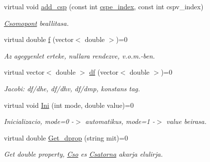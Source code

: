 \begin{DoxyCompactItemize}
virtual void \hyperlink{class_agelem_aa440ca95f0c0d27092f048f0c95cd998}{add\+\_\+csp} (const int \hyperlink{class_agelem_a9639c0a7a0165b644d62033e24eb6d24}{cspe\+\_\+index}, const int cspv\+\_\+index)
\begin{DoxyCompactList}\small\item\em \hyperlink{class_csomopont}{Csomopont} beallitasa. \end{DoxyCompactList}\item 
\mbox{\label{class_agelem_aa1d93be52ddae11df003c4e35c47084b}} 
virtual double \hyperlink{class_agelem_aa1d93be52ddae11df003c4e35c47084b}{f} (vector$<$ double $>$)=0
\begin{DoxyCompactList}\small\item\em Az agegyenlet erteke, nullara rendezve, v.\+o.\+m.-\/ben. \end{DoxyCompactList}\item 
\mbox{\label{class_agelem_a7934ea6320bdc37526ed3daa108ce1ed}} 
virtual vector$<$ double $>$ \hyperlink{class_agelem_a7934ea6320bdc37526ed3daa108ce1ed}{df} (vector$<$ double $>$)=0
\begin{DoxyCompactList}\small\item\em Jacobi\+: df/dhe, df/dhv, df/dmp, konstans tag. \end{DoxyCompactList}\item 
\mbox{\label{class_agelem_a844171faf01143770bbd894b1a48e72f}} 
virtual void \hyperlink{class_agelem_a844171faf01143770bbd894b1a48e72f}{Ini} (int mode, double value)=0
\begin{DoxyCompactList}\small\item\em Inicializacio, mode=0 -\/$>$ automatikus, mode=1 -\/$>$ value beirasa. \end{DoxyCompactList}\item 
\mbox{\label{class_agelem_abc0d957800007cf6f8dcef940d7b136b}} 
virtual double \hyperlink{class_agelem_abc0d957800007cf6f8dcef940d7b136b}{Get\+\_\+dprop} (string mit)=0
\begin{DoxyCompactList}\small\item\em Get double property, \hyperlink{class_cso}{Cso} es \hyperlink{class_csatorna}{Csatorna} akarja elulirja. \end{DoxyCompactList}\item 
\mbox{\label{class_agelem_a2e6c4688cdbdf17c6d3bde0c6c08ff49}} 

\end{DoxyCompactItemize}
